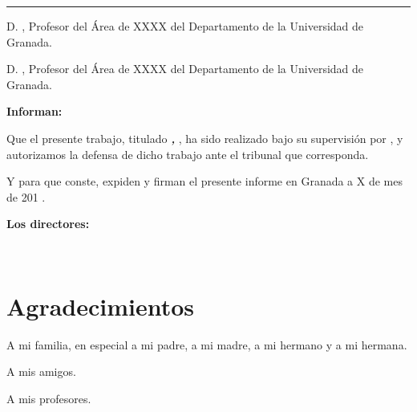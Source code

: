 \noindent\rule[-1ex]{\textwidth}{2pt}\bigskip\bigskip\bigskip

D. \textbf\myProf, Profesor del Área de XXXX del Departamento \myDepartment de la Universidad de Granada.

\vspace{0.5cm}

D. \textbf\myOtherProf, Profesor del Área de XXXX del Departamento \myDepartment de la Universidad de Granada.


\vspace{0.5cm}

\textbf{Informan:}

\vspace{0.5cm}

Que el presente trabajo, titulado \textit{\textbf{\myTitle, \mySubTitle}},
ha sido realizado bajo su supervisión por \textbf{\myName}, y autorizamos la defensa de dicho trabajo ante el tribunal
que corresponda.

\vspace{0.5cm}

Y para que conste, expiden y firman el presente informe en Granada a X de mes de 201 .

\vspace{1cm}

\textbf{Los directores:}

\vspace{5cm}

\noindent \textbf{\myProf \ \ \ \ \ \myOtherProf}

\chapter*{Agradecimientos}
\thispagestyle{empty}

       \vspace{1cm}


A mi familia, en especial a mi padre, a mi madre, a mi hermano y a mi hermana. 

A mis amigos.

A mis profesores.

